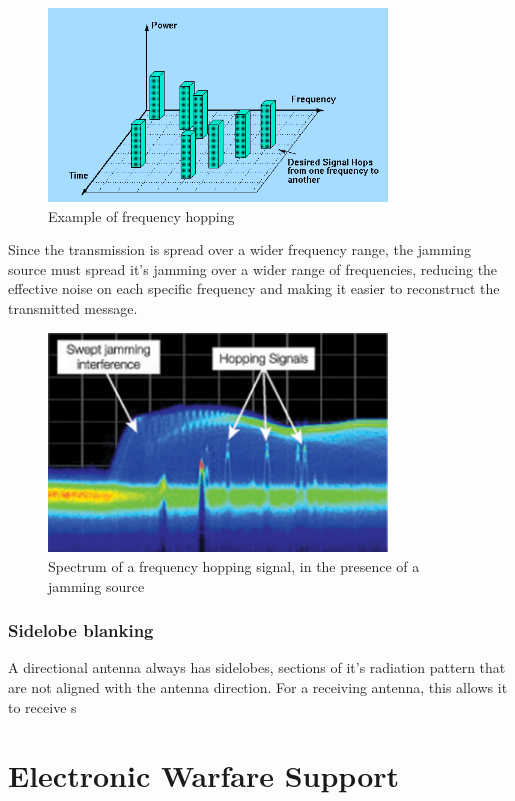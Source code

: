\documentclass[english,purist]{ist-report}
\begin{document}
\begin{figure}[ht]
\centering
\includegraphics[width=90mm]{frequency_hopping.PNG}
\caption{Example of frequency hopping}
\label{frequency_hopping}
\end{figure} 

Since the transmission is spread over a wider frequency range, the jamming source must spread it's jamming over a wider range of frequencies, reducing the effective noise on each specific frequency and making it easier to reconstruct the transmitted message.

\begin{figure}[ht]
\centering
\includegraphics[width=90mm]{frequency_hopping_jamming.png}
\caption{Spectrum of a frequency hopping signal, in the presence of a jamming source}
\label{frequency_hopping_jamming}
\end{figure} 

\section{Sidelobe blanking}

A directional antenna always has sidelobes, sections of it's radiation pattern that are not aligned with the antenna direction. For a receiving antenna, this allows it to receive s

\pagebreak
\part{Electronic Warfare Support}
\end{document}
